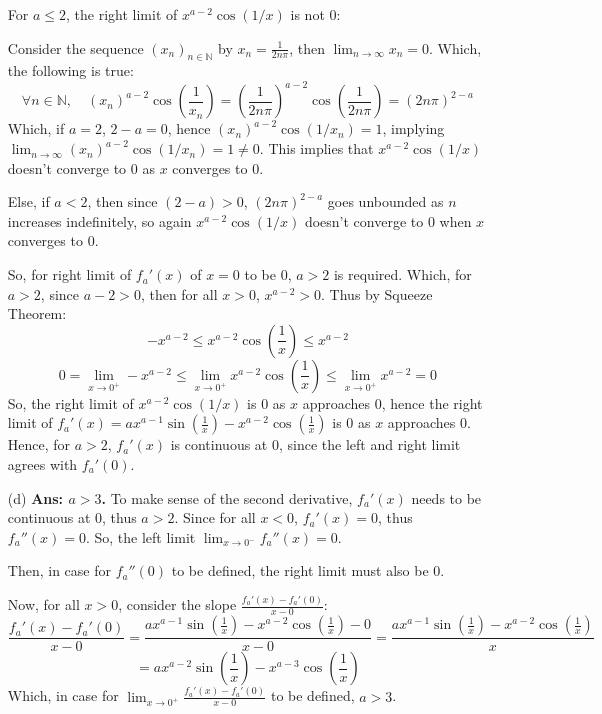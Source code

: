 \documentclass{article}
\begin{document}
\begin{itemize}
    \hfill

    For $a\leq 2$, the right limit of $x^{a-2}\cos(1/x)$ is not $0$:
    
    Consider the sequence $(x_n)_{n\in\mathbb{N}}$ by $x_n=\frac{1}{2n\pi}$, then $\lim_{n\rightarrow\infty}x_n=0$. Which, the following is true:
    $$\forall n\in\mathbb{N},\quad (x_n)^{a-2}\cos\left(\frac{1}{x_n}\right)=\left(\frac{1}{2n\pi}\right)^{a-2}\cos\left(\frac{1}{2n\pi}\right) = (2n\pi)^{2-a}$$
    Which, if $a=2$, $2-a=0$, hence $(x_n)^{a-2}\cos(1/x_n)=1$, implying $\lim_{n\rightarrow\infty}(x_n)^{a-2}\cos(1/x_n)=1\neq 0$. This implies that $x^{a-2}\cos(1/x)$ doesn't converge to $0$ as $x$ converges to $0$.

    Else, if $a<2$, then since $(2-a)>0$, $(2n\pi)^{2-a}$ goes unbounded as $n$ increases indefinitely, so again $x^{a-2}\cos(1/x)$ doesn't converge to $0$ when $x$ converges to $0$.

    \hfill

    So, for right limit of $f_a'(x)$ of $x=0$ to be $0$, $a>2$ is required. Which, for $a>2$, since $a-2>0$, then for all $x>0$, $x^{a-2}>0$. Thus by Squeeze Theorem:
    $$-x^{a-2}\leq x^{a-2}\cos\left(\frac{1}{x}\right)\leq x^{a-2}$$
    $$0=\lim_{x\rightarrow 0^+}-x^{a-2}\leq \lim_{x\rightarrow 0^+}x^{a-2}\cos\left(\frac{1}{x}\right)\leq \lim_{x\rightarrow 0^+}x^{a-2}=0$$
    So, the right limit of $x^{a-2}\cos(1/x)$ is $0$ as $x$ approaches $0$, hence the right limit of $f_a'(x)=ax^{a-1}\sin\left(\frac{1}{x}\right) - x^{a-2}\cos\left(\frac{1}{x}\right)$ is $0$ as $x$ approaches $0$.
    Hence, for $a>2$, $f_a'(x)$ is continuous at $0$, since the left and right limit agrees with $f_a'(0)$.

    \hfill
    
    \item[(d)] \textbf{Ans: $a>3$.} To make sense of the second derivative, $f_a'(x)$ needs to be continuous at $0$, thus $a>2$.
    Since for all $x<0$, $f_a'(x)=0$, thus $f_a''(x)=0$. So, the left limit $\lim_{x\rightarrow 0^-}f_a''(x)=0$.
    
    Then, in case for $f_a''(0)$ to be defined, the right limit must also be $0$.

    Now, for all $x>0$, consider the slope $\frac{f_a'(x)-f_a'(0)}{x-0}$:
    $$\frac{f_a'(x)-f_a'(0)}{x-0} = \frac{ax^{a-1}\sin\left(\frac{1}{x}\right) - x^{a-2}\cos\left(\frac{1}{x}\right)-0}{x-0} = \frac{ax^{a-1}\sin\left(\frac{1}{x}\right) - x^{a-2}\cos\left(\frac{1}{x}\right)}{x}$$
    $$ = ax^{a-2}\sin\left(\frac{1}{x}\right) - x^{a-3}\cos\left(\frac{1}{x}\right)$$
    Which, in case for $\lim_{x\rightarrow 0^+}\frac{f_a'(x)-f_a'(0)}{x-0}$ to be defined, $a>3$.


\end{itemize}
\end{document}
